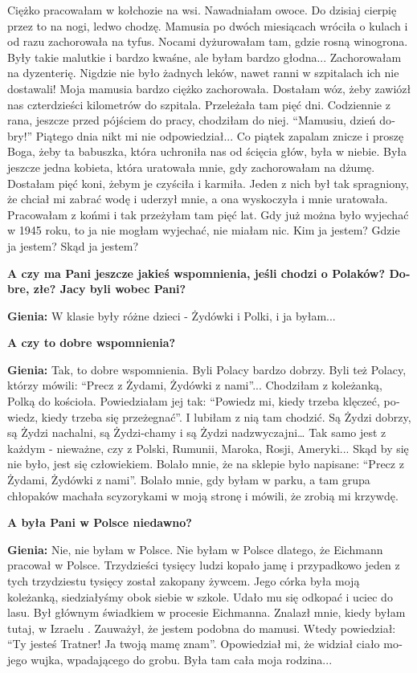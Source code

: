 \begin{otherlanguage}{ngerman}
Ciężko pracowałam w kołchozie na wsi. Nawadniałam owoce. Do dzisiaj cierpię przez to na nogi, ledwo chodzę. Mamusia po dwóch miesiącach wróciła o kulach i od razu zachorowała na tyfus. Nocami dyżurowałam tam, gdzie rosną winogrona. Były takie malutkie i bardzo kwaśne, ale byłam bardzo głodna... Zachorowałam na dyzenterię. Nigdzie nie było żadnych leków, nawet ranni w szpitalach ich nie dostawali! Moja mamusia bardzo ciężko zachorowała. Dostałam wóz, żeby zawiózł nas czterdzieści kilometrów do szpitala. Przeleżała tam pięć dni. Codziennie z rana, jeszcze przed pójściem do pracy, chodziłam do niej. "`Mamusiu, dzień dobry!"' Piątego dnia nikt mi nie odpowiedział...
Co piątek zapalam znicze i proszę Boga, żeby ta babuszka, która uchroniła nas od ścięcia głów, była w niebie. Była jeszcze jedna kobieta, która uratowała mnie, gdy zachorowałam na dżumę. Dostałam pięć koni, żebym je czyściła i karmiła. Jeden z nich był tak spragniony, że chciał mi zabrać wodę i uderzył mnie, a ona wyskoczyła i mnie uratowała. Pracowałam z końmi i tak przeżyłam tam pięć lat. Gdy już można było wyjechać w 1945 roku, to ja nie mogłam wyjechać, nie miałam nic. Kim ja jestem? Gdzie ja jestem? Skąd ja jestem?

\textbf{A czy ma Pani jeszcze jakieś wspomnienia, jeśli chodzi o Polaków? Dobre, złe? Jacy byli wobec Pani?}

\textbf{Gienia:} W klasie były różne dzieci - Żydówki i Polki, i ja byłam...

\textbf{A czy to dobre wspomnienia?}

\textbf{Gienia:} Tak, to dobre wspomnienia. Byli Polacy bardzo dobrzy. Byli też Polacy, którzy mówili: "`Precz z Żydami, Żydówki z nami"'... Chodziłam z koleżanką, Polką do kościoła. Powiedziałam jej tak: "`Powiedz mi, kiedy trzeba klęczeć, powiedz, kiedy trzeba się przeżegnać"'. I lubiłam z nią tam chodzić. Są Żydzi dobrzy, są Żydzi nachalni, są Żydzi-chamy i są Żydzi nadzwyczajni… Tak samo jest z każdym - nieważne, czy z Polski, Rumunii, Maroka, Rosji, Ameryki... Skąd by się nie było, jest się człowiekiem. Bolało mnie, że na sklepie było napisane: "`Precz z Żydami, Żydówki z nami"'. Bolało mnie, gdy byłam w parku, a tam grupa chłopaków machała scyzorykami w moją stronę i mówili, że zrobią mi krzywdę.

\textbf{A była Pani w Polsce niedawno?}

\textbf{Gienia:} Nie, nie byłam w Polsce. Nie byłam w Polsce dlatego, że Eichmann pracował w Polsce. Trzydzieści tysięcy ludzi kopało jamę i przypadkowo jeden z tych trzydziestu tysięcy został zakopany żywcem. Jego córka była moją koleżanką, siedziałyśmy obok siebie w szkole. Udało mu się odkopać i uciec do lasu. Był głównym świadkiem w procesie Eichmanna. Znalazł mnie, kiedy byłam tutaj, w Izraelu . Zauważył, że jestem podobna do mamusi. Wtedy powiedział: "`Ty jesteś Tratner! Ja twoją mamę znam"'. Opowiedział mi, że widział ciało mojego wujka, wpadającego do grobu. Była tam cała moja rodzina...
\end{otherlanguage}